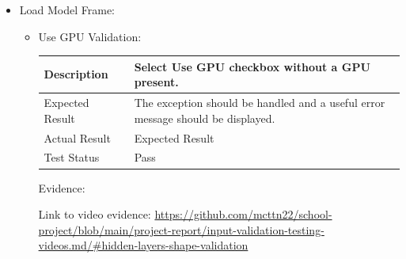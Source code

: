 \documentclass[./project-report/src/latex/project-report.tex]{subfiles}
\begin{document}
\begin{itemize}
    \item Load Model Frame:
    \label{sec:load-model-frame-input-validation}
    \begin{itemize}
        \item Use GPU Validation: \newline\newline
			\begin{tabular}{|p{0.25\linewidth}|p{0.75\linewidth}|}
				\hline
				Description & Select Use GPU checkbox without a GPU present. \\
				\hline
				Expected Result & The exception should be handled and a useful error message should be displayed. \\
				\hline
				Actual Result & Expected Result \\
				\hline
				Test Status & Pass \\
				\hline
			\end{tabular}
			
			\vspace{5mm}

			Evidence:
            \begin{figure}[h!]
			\centering
			\end{figure}

			Link to video evidence: \url{https://github.com/mcttn22/school-project/blob/main/project-report/input-validation-testing-videos.md/#hidden-layers-shape-validation}
    \end{itemize}

    \pagebreak


\end{itemize}
\end{document}
